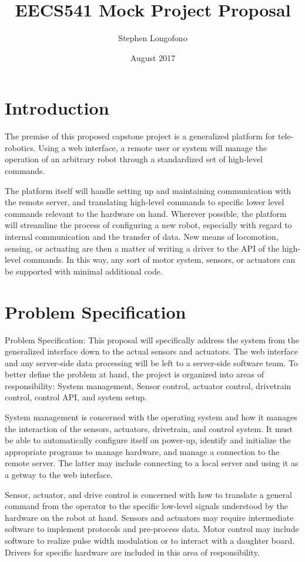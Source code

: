 \documentclass{article}
\title{EECS541 Mock Project Proposal}
\author{Stephen Longofono}
\date{August 2017}
\begin{document}
\maketitle

\section{Introduction}
The premise of this proposed capstone project is a generalized platform for tele-robotics.  Using a web interface, a remote user or system will manage the operation of an arbitrary robot through a standardized set of high-level commands.

The platform itself will handle setting up and maintaining communication with the remote server, and translating high-level commands to specific lower level commands relevant to the hardware on hand.  Wherever possible, the platform will streamline the process of configuring a new robot, especially with regard to internal communication and the transfer of data.  New means of locomotion, sensing, or actuating are then a matter of writing a driver to the API of the high-level commands.  In this way, any sort of motor system, sensors, or actuators can be supported with minimal additional code.

\section{Problem Specification}
Problem Specification:
This proposal will specifically address the system from the generalized interface down to the actual sensors and actuators.  The web interface and any server-side data processing will be left to a server-side software team.  To better define the problem at hand, the project is organized into areas of responsibility: System management, Sensor control, actuator control, drivetrain control, control API, and system setup.

System management is concerned with the operating system and how it manages the interaction of the sensors, actuators, drivetrain, and control system.  It must be able to automatically configure itself on power-up, identify and initialize the appropriate programs to manage hardware, and manage a connection to the remote server.  The latter may include connecting to a local server and using it as a getway to the web interface.

Sensor, actuator, and drive control is concerned with how to translate a general command from the operator to the specific low-level signals understood by the hardware on the robot at hand.  Sensors and actuators may require intermediate software to implement protocols and pre-process data.  Motor control may include software to realize pulse width modulation or to interact with a daughter board.  Drivers for specific hardware are included in this area of responsibility.
\end{document}
